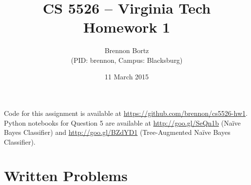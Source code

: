 \documentclass[11pt]{article}
\begin{document}
\title{CS 5526 -- Virginia Tech\\
	Homework 1}
\author{Brennon Bortz \\ (PID: brennon, Campus: Blacksburg)}
\date{11 March 2015}
\maketitle

Code for this assignment is available at \url{https://github.com/brennon/cs5526-hw1}. Python notebooks for Question 5 are available at \url{http://goo.gl/SeQn1b} (Na\"ive Bayes Classifier) and \url{http://goo.gl/BZdYD1} (Tree-Augmented Na\"ive Bayes Classifier).

\section*{Written Problems}
\end{document}

